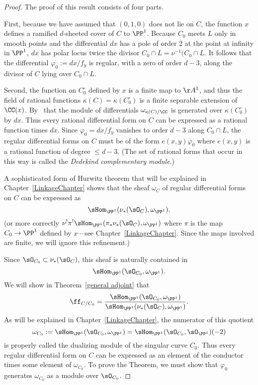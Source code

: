 \begin{proof}
The proof of this result consists of four parts. 

First, because we have assumed that $(0,1,0)$ does not lie on $C$, the function $x$ defines a
ramified $d$-sheeted cover of $C$ to $\PP^{1}$. Because $C_{0}$ meets $L$ only in smooth
points and the differential $dx$ has a pole of order 2 at the point at infinity in $\PP^{1}$,
$dx$
has polar locus twice the divisor $C_{0}\cap L = \nu^{-1}(C_{0}\cap L$. It follows that
the differential
$\varphi_0 := dx/f_{y}$ is regular, with a zero of order $d-3$,
along the divisor of $C$ lying over $C_0\cap L$.

Second, the function on $C^\circ_0$ defined by $x$  
is a finite map to $\AA^1$, and thus the field of rational functions $\kappa(C) = \kappa(C^\circ_0)$ is a finite
separable extension of $\CC(x)$. By~\cite[Section 16.5]{Eisenbud1995} that the module of differentials 
$\omega_{\kappa(C)/\CC}$ is generated over $\kappa(C^\circ_0)$ by $dx$. Thus every rational
differential form on $C$ can be expressed as a rational function
times $dx$. Since $\varphi_{0} = dx/f_{y}$ vanishes to order $d-3$ along $C_{0}\cap L$,
the regular differential forms on $C$ must be of the form $e(x,y)\varphi_{0}$ where
$e(x,y)$ is a rational function of degree $\leq d-3$. (The set of rational forms that occur in this
way is called the \emph{Dedekind complementary module}.)
 
A sophisticated form of Hurwitz theorem that will be explained in Chapter~\ref{LinkageChapter}
shows that the sheaf $\omega_{C}$ of regular differential forms on $C$ can be expressed as
$$
\sHom_{\PP^{1}}(\nu_{*}(\sO_{C}), \omega_{\PP^{1}}).
$$
(or more correctly $\nu^{!}\pi^{!}\sHom_{\PP^{1}}(\pi_{*}\nu_{*}(\sO_{C}), \omega_{\PP^{1}})$
where $\pi$ is the map $C_{0}\to \PP^{1}$ defined by $x$---see Chapter~\ref{LinkageChapter}. Since the maps involved are finite,
we will ignore this refinement.)

Since $\sO_{C_{0}}\subset \nu_{*}(\sO_{C})$, this sheaf is naturally contained
in 
$$
\sHom_{\PP^{1}}(\sO_{C_{0}}, \omega_{\PP^{1}}).
$$
We will show in Theorem~\ref{general adjoint} that 
$$
\ff_{C/C_{0}} = 
\frac{\sHom_{\PP^{1}}(\sO_{C_{0}}, \omega_{\PP^{1}})}
{\sHom_{\PP^{1}}(\nu_{*}(\sO_{C}), \omega_{\PP^{1}})}.
$$
As will be explained in Chapter~\ref{LinkageChapter}, the numerator of this quotient
$$
\omega_{C_{0}}:= \sHom_{\PP^{1}}(\sO_{C_{0}}, \omega_{\PP^{1}}) = 
\sHom_{\PP^{1}}(\sO_{C_{0}}, \sO_{\PP^{1}})(-2)
$$
 is properly called the dualizing module  of the singular curve $C_{0}$.
Thus every regular differential form on $C$ can be expressed as an element of the conductor
times some element of $\omega_{C_{0}}$. To prove the Theorem, we must show that
$\varphi_{0}$ generates $\omega_{C_{0}}$ as a module over $\sO_{C_{0}}$.


\end{proof}
